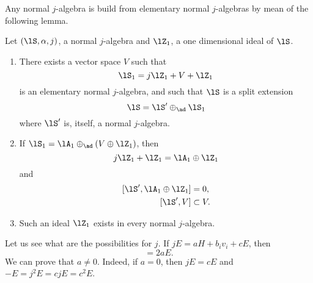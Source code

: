 Any normal $j$-algebra is build from elementary normal $j$-algebras by mean of the following lemma.
\begin{proposition}         \label{PropStructNormalJalg}
	Let $(\lS,\alpha,j)$, a normal $j$-algebra and $\lZ_1$, a one dimensional ideal of $\lS$.
	\begin{enumerate}

		\item
		      There exists a vector space $V$ such that
		      \begin{equation}
			      \lS_1=j\lZ_1+V+\lZ_1
		      \end{equation}
		      is an elementary normal $j$-algebra, and such that $\lS$ is a split extension
		      \begin{equation}        \label{EqDecNormale}
			      \lS=\lS'\oplus_{\ad}\lS_1
		      \end{equation}
		      where $\lS'$ is, itself, a normal $j$-algebra.

		\item
		      If $\lS_1=\lA_1\oplus_{\ad}(V\oplus\lZ_1)$, then
		      \begin{equation}
			      j\lZ_1+\lZ_1=\lA_1\oplus\lZ_1
		      \end{equation}
		      and
		      \begin{equation}
			      \begin{aligned}[]
				      [\lS',\lA_1\oplus\lZ_1] & =0,        \\
				      [\lS',V]                & \subset V.
			      \end{aligned}
		      \end{equation}
		\item
		      Such an ideal $\lZ_1$ exists in every normal $j$-algebra.
	\end{enumerate}
\end{proposition}

Let us see what are the possibilities for $j$. If $jE=aH+b_iv_i+cE$, then
\begin{equation}
	[jE,E]=2aE.
\end{equation}
We can prove that $a\neq 0$. Indeed, if $a=0$, then $jE=cE$ and $-E=j^2E=cjE=c^2E$.

